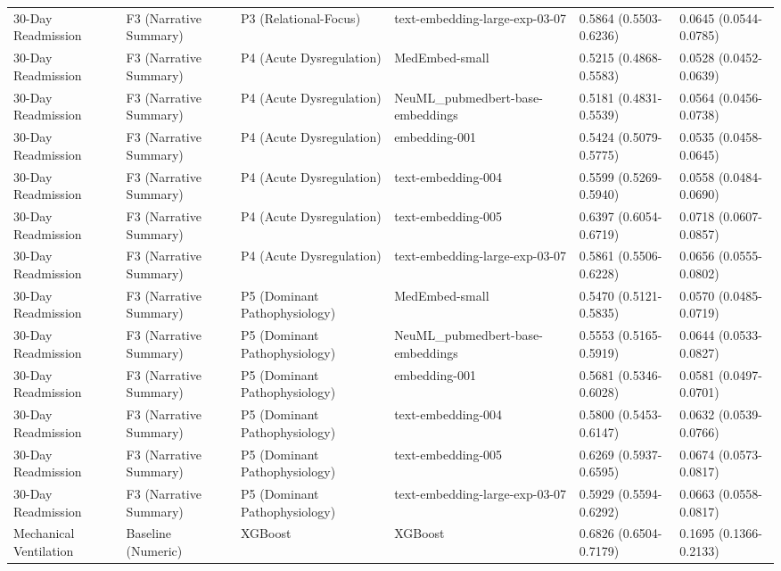 \documentclass[border=0pt]{standalone}
\begin{document}
\begin{adjustbox}{width=\textwidth}
\begin{tabular}{llllll}
30-Day Readmission & F3 (Narrative Summary) & P3 (Relational-Focus) & text-embedding-large-exp-03-07 & 0.5864 (0.5503-0.6236) & 0.0645 (0.0544-0.0785) \\
30-Day Readmission & F3 (Narrative Summary) & P4 (Acute Dysregulation) & MedEmbed-small & 0.5215 (0.4868-0.5583) & 0.0528 (0.0452-0.0639) \\
30-Day Readmission & F3 (Narrative Summary) & P4 (Acute Dysregulation) & NeuML\_pubmedbert-base-embeddings & 0.5181 (0.4831-0.5539) & 0.0564 (0.0456-0.0738) \\
30-Day Readmission & F3 (Narrative Summary) & P4 (Acute Dysregulation) & embedding-001 & 0.5424 (0.5079-0.5775) & 0.0535 (0.0458-0.0645) \\
30-Day Readmission & F3 (Narrative Summary) & P4 (Acute Dysregulation) & text-embedding-004 & 0.5599 (0.5269-0.5940) & 0.0558 (0.0484-0.0690) \\
30-Day Readmission & F3 (Narrative Summary) & P4 (Acute Dysregulation) & text-embedding-005 & 0.6397 (0.6054-0.6719) & 0.0718 (0.0607-0.0857) \\
30-Day Readmission & F3 (Narrative Summary) & P4 (Acute Dysregulation) & text-embedding-large-exp-03-07 & 0.5861 (0.5506-0.6228) & 0.0656 (0.0555-0.0802) \\
30-Day Readmission & F3 (Narrative Summary) & P5 (Dominant Pathophysiology) & MedEmbed-small & 0.5470 (0.5121-0.5835) & 0.0570 (0.0485-0.0719) \\
30-Day Readmission & F3 (Narrative Summary) & P5 (Dominant Pathophysiology) & NeuML\_pubmedbert-base-embeddings & 0.5553 (0.5165-0.5919) & 0.0644 (0.0533-0.0827) \\
30-Day Readmission & F3 (Narrative Summary) & P5 (Dominant Pathophysiology) & embedding-001 & 0.5681 (0.5346-0.6028) & 0.0581 (0.0497-0.0701) \\
30-Day Readmission & F3 (Narrative Summary) & P5 (Dominant Pathophysiology) & text-embedding-004 & 0.5800 (0.5453-0.6147) & 0.0632 (0.0539-0.0766) \\
30-Day Readmission & F3 (Narrative Summary) & P5 (Dominant Pathophysiology) & text-embedding-005 & 0.6269 (0.5937-0.6595) & 0.0674 (0.0573-0.0817) \\
30-Day Readmission & F3 (Narrative Summary) & P5 (Dominant Pathophysiology) & text-embedding-large-exp-03-07 & 0.5929 (0.5594-0.6292) & 0.0663 (0.0558-0.0817) \\
Mechanical Ventilation & Baseline (Numeric) & XGBoost & XGBoost & 0.6826 (0.6504-0.7179) & 0.1695 (0.1366-0.2133) \\

\end{tabular}
\end{adjustbox}
\end{document}
